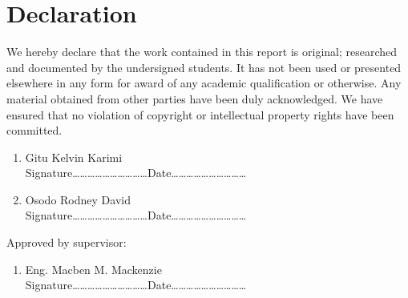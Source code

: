 \section*{Declaration}


We hereby declare that the work contained in this report is original; researched and documented by the undersigned students. It has not been used or presented elsewhere in any form for award of any academic qualification or otherwise. Any material obtained from other parties have been duly acknowledged. We have ensured that no violation of copyright or intellectual property rights have been committed.
\begin{enumerate}
	\item Gitu Kelvin Karimi\vspace*{.2cm}\\
	Signature\ldots\ldots\ldots\ldots\ldots\ldots\ldots\ldots\ldots\ldots Date\ldots\ldots\ldots\ldots\ldots\ldots\ldots\ldots\ldots\ldots
	\item Osodo Rodney David\vspace*{.2cm}\\
	Signature\ldots\ldots\ldots\ldots\ldots\ldots\ldots\ldots\ldots\ldots Date\ldots\ldots\ldots\ldots\ldots\ldots\ldots\ldots\ldots\ldots
\end{enumerate}

\vspace*{.5cm}
Approved by supervisor:
\begin{enumerate}
	\item Eng. Macben M. Mackenzie\vspace*{.2cm}\\
	Signature\ldots\ldots\ldots\ldots\ldots\ldots\ldots\ldots\ldots\ldots Date\ldots\ldots\ldots\ldots\ldots\ldots\ldots\ldots\ldots\ldots
\end{enumerate}


